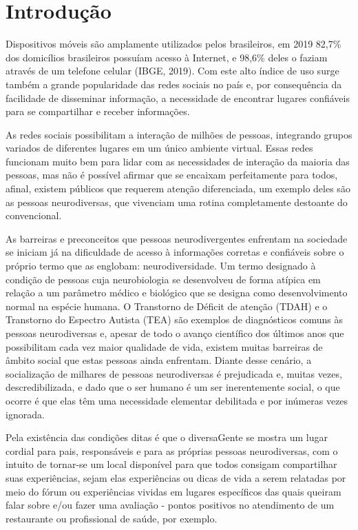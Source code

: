 
\chapter[Introdução]{Introdução}

Dispositivos móveis são amplamente utilizados pelos brasileiros, em 2019 82,7\% dos domicílios brasileiros possuíam acesso à Internet, e 98,6\% deles o faziam através de um telefone celular (IBGE, 2019). Com este alto índice de uso surge também a grande popularidade das redes sociais no país e, por consequência da facilidade de disseminar informação, a necessidade de encontrar lugares confiáveis para se compartilhar e receber informações.

As redes sociais possibilitam a interação de milhões de pessoas, integrando grupos variados de diferentes lugares em um único ambiente virtual. Essas redes funcionam muito bem para lidar com as necessidades de interação da maioria das pessoas, mas não é possível afirmar que se encaixam perfeitamente para todos, afinal, existem públicos que requerem atenção diferenciada, um exemplo deles são as pessoas neurodiversas, que vivenciam uma rotina completamente destoante do convencional.

As barreiras e preconceitos que pessoas neurodivergentes enfrentam na sociedade se iniciam já na dificuldade de acesso à informações corretas e confiáveis sobre o próprio termo que as englobam: neurodiversidade. Um termo designado à condição de pessoas cuja neurobiologia se desenvolveu de forma atípica em relação a um parâmetro médico e biológico que se designa como desenvolvimento normal na espécie humana. O Transtorno de Déficit de atenção (TDAH) e o Transtorno do Espectro Autista (TEA) são exemplos de diagnósticos comuns às pessoas neurodiversas e, apesar de todo o avanço científico dos últimos anos que possibilitam cada vez maior qualidade de vida, existem muitas barreiras de âmbito social que estas pessoas ainda enfrentam. Diante desse cenário, a socialização de milhares de pessoas neurodiversas é prejudicada e, muitas vezes, descredibilizada, e dado que o ser humano é um ser inerentemente social, o que ocorre é que elas têm uma necessidade elementar debilitada e por inúmeras vezes ignorada.

Pela existência das condições ditas é que o diversaGente se mostra um lugar cordial para pais, responsáveis e para as próprias pessoas neurodiversas, com o intuito de tornar-se um local disponível para que todos consigam compartilhar suas experiências, sejam elas experiências ou dicas de vida a serem relatadas por meio do fórum ou experiências vividas em lugares específicos das quais queiram falar sobre e/ou fazer uma avaliação - pontos positivos no atendimento de um restaurante ou profissional de saúde, por exemplo.

